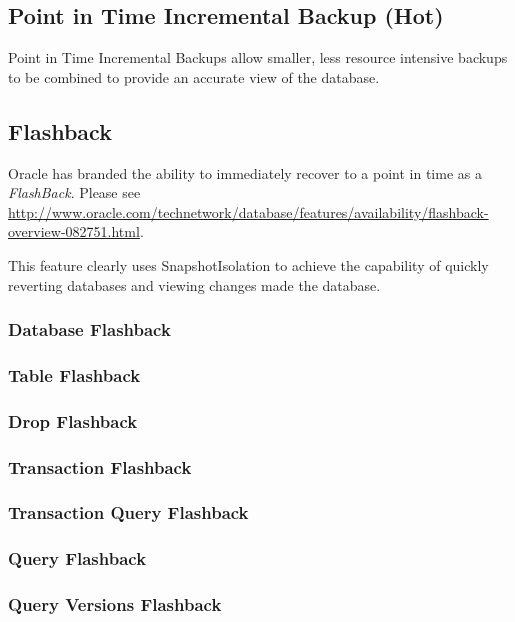 \subsection{Point in Time Incremental Backup (Hot)}
Point in Time Incremental Backups allow smaller, less resource intensive backups
to be combined to provide an accurate view of the database.

\subsection{Flashback}

Oracle has branded the ability to immediately recover to a point in time as a
\emph{FlashBack}.  Please see
\url{http://www.oracle.com/technetwork/database/features/availability/flashback-overview-082751.html}.

This feature clearly uses SnapshotIsolation to achieve the capability of quickly
reverting databases and viewing changes made the database.

\subsubsection{Database Flashback}


\subsubsection{Table Flashback}

\subsubsection{Drop Flashback}

\subsubsection{Transaction Flashback}

\subsubsection{Transaction Query Flashback}

\subsubsection{Query Flashback}

\subsubsection{Query Versions Flashback}

